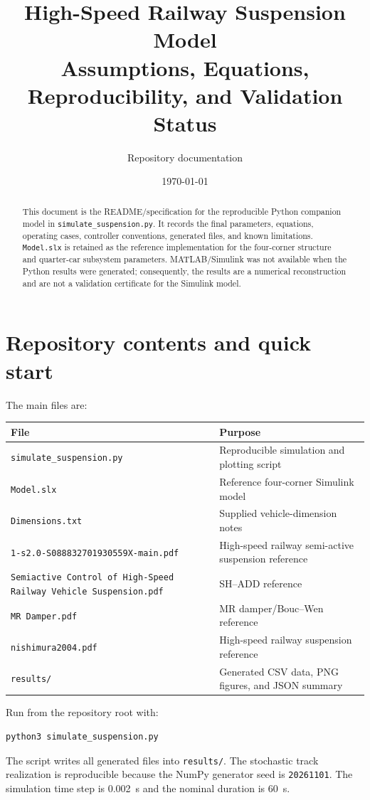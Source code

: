 \documentclass[11pt,a4paper]{article}
\title{High-Speed Railway Suspension Model\\Assumptions, Equations, Reproducibility, and Validation Status}
\author{Repository documentation}
\date{\today}
\begin{document}
\maketitle

\begin{abstract}
This document is the README/specification for the reproducible Python companion model in \texttt{simulate\_suspension.py}. It records the final parameters, equations, operating cases, controller conventions, generated files, and known limitations. \texttt{Model.slx} is retained as the reference implementation for the four-corner structure and quarter-car subsystem parameters. MATLAB/Simulink was not available when the Python results were generated; consequently, the results are a numerical reconstruction and are not a validation certificate for the Simulink model.
\end{abstract}

\tableofcontents

\section{Repository contents and quick start}
The main files are:
\begin{center}
\begin{tabular}{ll}
\toprule
File & Purpose\\
\midrule
\texttt{simulate\_suspension.py} & Reproducible simulation and plotting script\\
\texttt{Model.slx} & Reference four-corner Simulink model\\
\texttt{Dimensions.txt} & Supplied vehicle-dimension notes\\
\texttt{1-s2.0-S088832701930559X-main.pdf} & High-speed railway semi-active suspension reference\\
\texttt{Semiactive Control of High-Speed Railway Vehicle Suspension.pdf} & SH--ADD reference\\
\texttt{MR Damper.pdf} & MR damper/Bouc--Wen reference\\
\texttt{nishimura2004.pdf} & High-speed railway suspension reference\\
\texttt{results/} & Generated CSV data, PNG figures, and JSON summary\\
\bottomrule
\end{tabular}
\end{center}

Run from the repository root with:
\begin{verbatim}
python3 simulate_suspension.py
\end{verbatim}
The script writes all generated files into \texttt{results/}. The stochastic track realization is reproducible because the NumPy generator seed is \texttt{20261101}. The simulation time step is \SI{0.002}{s} and the nominal duration is \SI{60}{s}.
\end{document}
